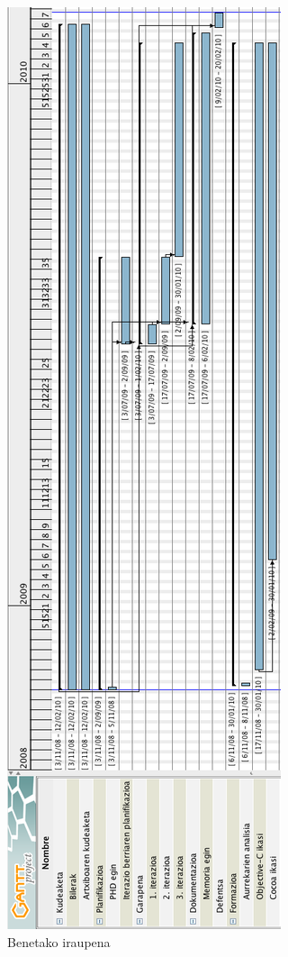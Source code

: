 \begin{figure}[htp]
\begin{center}
\includegraphics[scale=0.4]{Pictures/Chapter4/Ondorioak/iraupena.png}
\caption{Benetako iraupena}
\label{benetako-gantt}
\end{center}
\end{figure}
